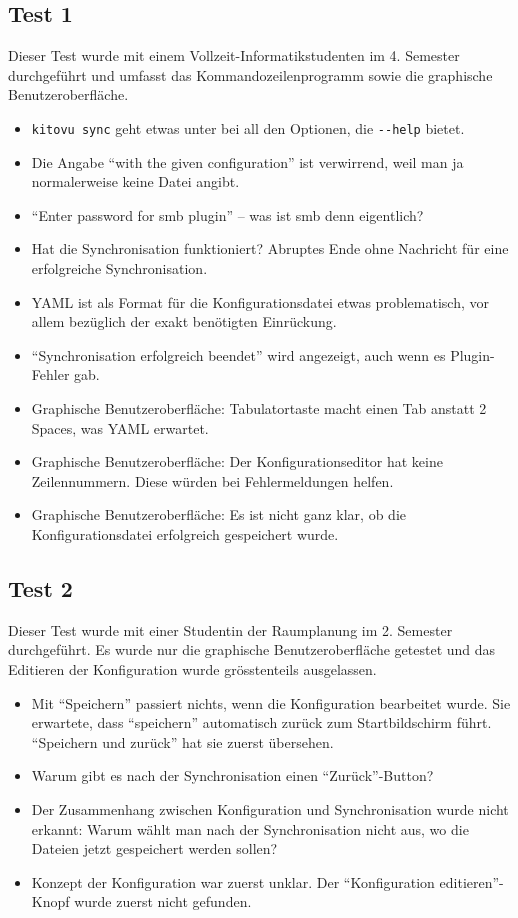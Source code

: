 \documentclass[a4paper]{article}
\begin{document}
  \subsection{Test 1}

  Dieser Test wurde mit einem Vollzeit-Informatikstudenten im 4. Semester durchgeführt und umfasst das Kommandozeilenprogramm sowie die graphische Benutzeroberfläche.

  \begin{itemize}
    \item \verb|kitovu sync| geht etwas unter bei all den Optionen, die \verb|--help| bietet.
    \item Die Angabe ``with the given configuration'' ist verwirrend, weil man ja normalerweise keine Datei angibt.
    \item ``Enter password for smb plugin'' -- was ist smb denn eigentlich?
    \item Hat die Synchronisation funktioniert? Abruptes Ende ohne Nachricht für eine erfolgreiche Synchronisation.
    \item YAML ist als Format für die Konfigurationsdatei etwas problematisch, vor allem bezüglich der exakt benötigten Einrückung.
    \item ``Synchronisation erfolgreich beendet'' wird angezeigt, auch wenn es Plugin-Fehler gab.
    \item Graphische Benutzeroberfläche: Tabulatortaste macht einen Tab anstatt 2 Spaces, was YAML erwartet.
    \item Graphische Benutzeroberfläche: Der Konfigurationseditor hat keine Zeilennummern. Diese würden bei Fehlermeldungen helfen.
    \item Graphische Benutzeroberfläche: Es ist nicht ganz klar, ob die Konfigurationsdatei erfolgreich gespeichert wurde.
  \end{itemize}

  \subsection{Test 2}

  Dieser Test wurde mit einer Studentin der Raumplanung im 2. Semester durchgeführt. Es wurde nur die graphische Benutzeroberfläche getestet und das Editieren der Konfiguration wurde grösstenteils ausgelassen.

  \begin{itemize}
    \item Mit ``Speichern'' passiert nichts, wenn die Konfiguration bearbeitet wurde. Sie erwartete, dass ``speichern'' automatisch zurück zum Startbildschirm führt. ``Speichern und zurück'' hat sie zuerst übersehen.
    \item Warum gibt es nach der Synchronisation einen ``Zurück''-Button?
    \item Der Zusammenhang zwischen Konfiguration und Synchronisation wurde nicht erkannt: Warum wählt man nach der Synchronisation nicht aus, wo die Dateien jetzt gespeichert werden sollen?
    \item Konzept der Konfiguration war zuerst unklar. Der ``Konfiguration editieren''-Knopf wurde zuerst nicht gefunden.
  \end{itemize}
\end{document}
